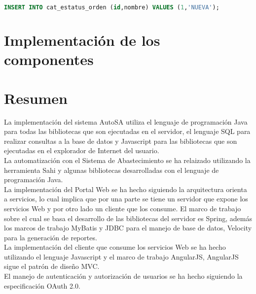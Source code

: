 \begin{lstlisting}[language=SQL, caption={Sentencia insertar un registro.}, captionpos=b, label={lst:sql-insert}]
INSERT INTO cat_estatus_orden (id,nombre) VALUES (1,'NUEVA');
\end{lstlisting}

%

\section{Implementación de los componentes}







%

\section{Resumen}
La implementación del sistema AutoSA utiliza el lenguaje de programación Java para todas las bibliotecas que son ejecutadas en el servidor, el lenguaje SQL para realizar consultas a la base de datos y Javascript para las bibliotecas que son ejecutadas en el explorador de Internet del usuario.\\
La automatización con el Sistema de Abastecimiento se ha relaizado utilizando la herramienta Sahi y algunas bibliotecas desarrolladas con el lenguaje de programación Java.\\
La implementación del Portal Web se ha hecho siguiendo la arquitectura orienta a servicios, lo cual implica que por una parte se tiene un servidor que expone los servicios Web y por otro lado un cliente que los consume. El marco de trabajo sobre el cual se basa el desarrollo de las bibliotecas del servidor es Spring, además los marcos de trabajo MyBatis y JDBC para el manejo de base de datos, Velocity para la generación de reportes.\\
La implementación del cliente que consume los servicios Web se ha hecho utilizando el lenguaje Javascript y el marco de trabajo AngularJS, AngularJS sigue el patrón de diseño MVC.\\
El manejo de autenticación y autorización de usuarios se ha hecho siguiendo la especificación OAuth 2.0.
